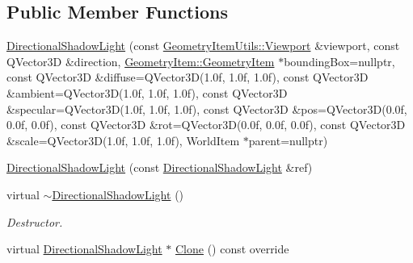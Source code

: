 \subsection*{Public Member Functions}
\begin{DoxyCompactItemize}
\item 
\mbox{\hyperlink{class_geometry_engine_1_1_geometry_world_item_1_1_geometry_light_1_1_directional_shadow_light_a57058423d88f8ba33abdae7b04bb5a92}{Directional\+Shadow\+Light}} (const \mbox{\hyperlink{class_geometry_engine_1_1_geometry_item_utils_1_1_viewport}{Geometry\+Item\+Utils\+::\+Viewport}} \&viewport, const Q\+Vector3D \&direction, \mbox{\hyperlink{class_geometry_engine_1_1_geometry_world_item_1_1_geometry_item_1_1_geometry_item}{Geometry\+Item\+::\+Geometry\+Item}} $\ast$bounding\+Box=nullptr, const Q\+Vector3D \&diffuse=Q\+Vector3D(1.\+0f, 1.\+0f, 1.\+0f), const Q\+Vector3\+D \&ambient=\+Q\+Vector3\+D(1.\+0f, 1.\+0f, 1.\+0f), const Q\+Vector3\+D \&specular=\+Q\+Vector3\+D(1.\+0f, 1.\+0f, 1.\+0f), const Q\+Vector3\+D \&pos=\+Q\+Vector3\+D(0.\+0f, 0.\+0f, 0.\+0f), const Q\+Vector3\+D \&rot=\+Q\+Vector3\+D(0.\+0f, 0.\+0f, 0.\+0f), const Q\+Vector3\+D \&scale=\+Q\+Vector3\+D(1.\+0f, 1.\+0f, 1.\+0f), World\+Item $\ast$parent=nullptr)
\item 
\mbox{\hyperlink{class_geometry_engine_1_1_geometry_world_item_1_1_geometry_light_1_1_directional_shadow_light_ad01c71215f6c7c3065f9d6dcc0ea195c}{Directional\+Shadow\+Light}} (const \mbox{\hyperlink{class_geometry_engine_1_1_geometry_world_item_1_1_geometry_light_1_1_directional_shadow_light}{Directional\+Shadow\+Light}} \&ref)
\item 
\mbox{\label{class_geometry_engine_1_1_geometry_world_item_1_1_geometry_light_1_1_directional_shadow_light_aa35bdba1338d8ba80a7d59558df8a105}} 
virtual \mbox{\hyperlink{class_geometry_engine_1_1_geometry_world_item_1_1_geometry_light_1_1_directional_shadow_light_aa35bdba1338d8ba80a7d59558df8a105}{$\sim$\+Directional\+Shadow\+Light}} ()
\begin{DoxyCompactList}\small\item\em Destructor. \end{DoxyCompactList}\item 
virtual \mbox{\hyperlink{class_geometry_engine_1_1_geometry_world_item_1_1_geometry_light_1_1_directional_shadow_light}{Directional\+Shadow\+Light}} $\ast$ \mbox{\hyperlink{class_geometry_engine_1_1_geometry_world_item_1_1_geometry_light_1_1_directional_shadow_light_ae5016cad41a62c4c870a942acc3f9afe}{Clone}} () const override

\end{DoxyCompactItemize}
